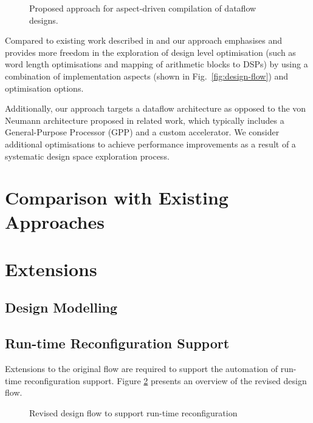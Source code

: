 \begin{figure}[!ht]
  \centering
  \def\svgwidth{\textwidth}
  
  \caption{Proposed approach for aspect-driven compilation of dataflow
   designs.}
  \label{fig:reconfig-design-flow}
\end{figure}

Compared to existing work described in
\cite{Cardoso:Teixeira:Alves:Nobre:Diniz:Cutinho:Luk:2012} and
\cite{cardoso2011new} our approach emphasises and provides more
freedom in the exploration of design level optimisation (such as word
length optimisations and mapping of arithmetic blocks to DSPs) by
using a combination of implementation aspects (shown in
Fig.~\ref{fig:design-flow}) and \FAST{} optimisation options.

Additionally, our approach targets a dataflow architecture as opposed
to the von Neumann architecture proposed in related work, which
typically includes a General-Purpose Processor (GPP) and a custom
accelerator. We consider additional optimisations to achieve
performance improvements as a result of a systematic design space
exploration process.

\section{Comparison with Existing Approaches}

\section{Extensions}

\subsection{Design Modelling}

\subsection{Run-time Reconfiguration Support}

Extensions to the original flow are required to support the automation
of run-time reconfiguration support. Figure
\ref{fig:reconfig-design-flow} presents an overview of the revised
design flow.

\begin{figure}[!ht]
  \centering
  \def\svgwidth{\textwidth}
  
  \caption{Revised design flow to support run-time reconfiguration}
  \label{fig:reconfig-design-flow}
\end{figure}

